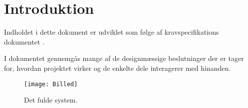 \documentclass[Main]{Subfiles}
\begin{document}
\chapter{Introduktion}
Indholdet i dette dokument er udviklet som følge af kravspecifikations dokumentet \cite{KravSpec}.

I dokumentet gennemgås mange af de designmæssige beslutninger der er tager for, hvordan projektet virker og de enkelte dele interagerer med hinanden.


\begin{figure}[H]
\centering
\texttt{[image: Billed]}
\caption{Det fulde system.}
\end{figure}
\end{document}
